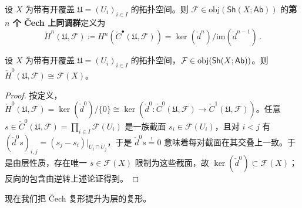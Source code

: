 \begin{Def}
设 $X$ 为带有开覆盖 $\mathfrak{U}=(U_i)_{i\in I}$ 的拓扑空间。则 $\mathcal{F}\in\text{obj}(\mathsf{Sh}(X;\mathsf{Ab}))$ 的\textbf{第 $n$ 个 \v{C}ech 上同调群}定义为
\begin{equation}
	\check{H}^n(\mathfrak{U},\mathcal{F})\coloneqq H^n(\check{C}^\bullet(\mathfrak{U},\mathcal{F}))=\ker(\check{d}^n)/\text{im}(\check{d}^{n-1})\,.
\end{equation}
\end{Def}

\begin{Lem}\label{CechH0isglobalsect}
设 $X$ 为带有开覆盖 $\mathfrak{U}=(U_i)_{i\in I}$ 的拓扑空间，$\mathcal{F}\in\textup{obj}(\mathsf{Sh}(X;\mathsf{Ab}))$。则 $\check{H}^0(\mathfrak{U},\mathcal{F})\cong\mathcal{F}(X)$。
\end{Lem}

\begin{proof}
按定义，$\check{H}^0(\mathfrak{U},\mathcal{F})=\ker(\check{d}^0)/\{0\}\cong\ker(\check{d}^0\!:\check{C}^0(\mathfrak{U},\mathcal{F})\rightarrow \check{C}^1(\mathfrak{U},\mathcal{F}))$。任意 $s\in \check{C}^0(\mathfrak{U},\mathcal{F})=\prod_{i\in I}\mathcal{F}(U_i)$ 是一族截面 $s_i\in\mathcal{F}(U_i)$，且对 $i<j$ 有 $(\check{d}^0s)_{i,j}=(s_j-s_i)|_{U_i\cap U_j}$，于是 $\check{d}^0s\overset{!}{=}0$ 意味着每对截面在其交叠上一致。于是由层性质，存在唯一 $s\in\mathcal{F}(X)$ 限制为这些截面，故 $\ker(\check{d}^0)\subset \mathcal{F}(X)$；反向的包含由逆转上述论证得到。
\end{proof}

现在我们把 \v{C}ech 复形提升为层的复形。

